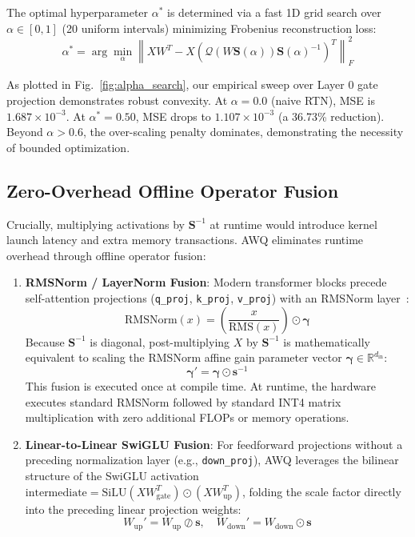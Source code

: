 \documentclass[conference]{IEEEtran}
\begin{document}
The optimal hyperparameter $\alpha^*$ is determined via a fast 1D grid search over $\alpha \in [0, 1]$ (20 uniform intervals) minimizing Frobenius reconstruction loss:
\begin{equation}
\alpha^* = \arg\min_\alpha \left\| X W^T - X \left( \mathcal{Q}(W \mathbf{S}(\alpha)) \mathbf{S}(\alpha)^{-1} \right)^T \right\|_F^2
\end{equation}

As plotted in Fig.~\ref{fig:alpha_search}, our empirical sweep over Layer 0 gate projection demonstrates robust convexity. At $\alpha=0.0$ (naive RTN), MSE is $1.687 \times 10^{-3}$. At $\alpha^* = 0.50$, MSE drops to $1.107 \times 10^{-3}$ (a 36.73\% reduction). Beyond $\alpha > 0.6$, the over-scaling penalty dominates, demonstrating the necessity of bounded optimization.

\subsection{Zero-Overhead Offline Operator Fusion}
Crucially, multiplying activations by $\mathbf{S}^{-1}$ at runtime would introduce kernel launch latency and extra memory transactions. AWQ eliminates runtime overhead through offline operator fusion:
\begin{enumerate}
    \item \textbf{RMSNorm / LayerNorm Fusion}: Modern transformer blocks precede self-attention projections (\texttt{q\_proj}, \texttt{k\_proj}, \texttt{v\_proj}) with an RMSNorm layer~\cite{zhang2019rmsnorm}:
    \begin{equation}
    \text{RMSNorm}(x) = \left( \frac{x}{\text{RMS}(x)} \right) \odot \boldsymbol{\gamma}
    \end{equation}
    Because $\mathbf{S}^{-1}$ is diagonal, post-multiplying $X$ by $\mathbf{S}^{-1}$ is mathematically equivalent to scaling the RMSNorm affine gain parameter vector $\boldsymbol{\gamma} \in \mathbb{R}^{d_{\text{in}}}$:
    \begin{equation}
    \boldsymbol{\gamma}' = \boldsymbol{\gamma} \odot \mathbf{s}^{-1}
    \end{equation}
    This fusion is executed once at compile time. At runtime, the hardware executes standard RMSNorm followed by standard INT4 matrix multiplication with zero additional FLOPs or memory operations.
    \item \textbf{Linear-to-Linear SwiGLU Fusion}: For feedforward projections without a preceding normalization layer (e.g., \texttt{down\_proj}), AWQ leverages the bilinear structure of the SwiGLU activation $\text{intermediate} = \text{SiLU}(X W_{\text{gate}}^T) \odot (X W_{\text{up}}^T)$, folding the scale factor directly into the preceding linear projection weights:
    \begin{equation}
    W_{\text{up}}' = W_{\text{up}} \oslash \mathbf{s}, \quad W_{\text{down}}' = W_{\text{down}} \odot \mathbf{s}
    \end{equation}
\end{enumerate}
\end{document}

